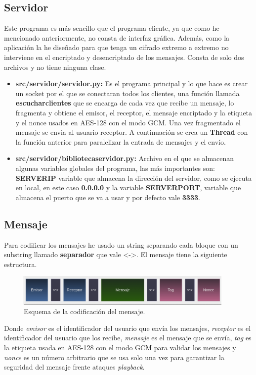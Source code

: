 \subsection{Servidor}
Este programa es más sencillo que el programa cliente, ya que como he mencionado anteriormente, no consta de interfaz gráfica. Además, como la aplicación la he diseñado para que tenga un cifrado extremo a extremo no interviene en el encriptado y desencriptado de los mensajes. Consta de solo dos archivos y no tiene ninguna clase.
\begin{itemize}
	\item \textbf{src/servidor/servidor.py:} Es el programa principal y lo que hace es crear un socket por el que se conectaran todos los clientes, una función llamada \textbf{escuchar\textunderscore clientes} que se encarga de cada vez que recibe un mensaje, lo fragmenta y obtiene el emisor, el receptor, el mensaje encriptado y la etiqueta y el nonce usados en AES-128 con el modo GCM. Una vez fragmentado el mensaje se envia al usuario receptor. A continuación se crea un \textbf{Thread} con la función anterior para paralelizar la entrada de mensajes y el envío.
	\item \textbf{src/servidor/biblioteca\textunderscore servidor.py:} Archivo en el que se almacenan algunas variables globales del programa, las más importantes son: \textbf{SERVER\textunderscore IP} variable que almacena la dirección del servidor, como se ejecuta en local, en este caso \textbf{0.0.0.0} y la variable \textbf{SERVER\textunderscore PORT}, variable que almacena el puerto que se va a usar y por defecto vale \textbf{3333}.
\end{itemize}

\subsection{Mensaje}
Para codificar los mensajes he usado un string separando cada bloque con un substring llamado \textbf{separador} que vale \textless-\textgreater. El mensaje tiene la siguiente estructura.

\begin{figure}[htb]
	\centering
	\includegraphics[width=400]{imagenes/mensaje_app.png} 
	\caption{Esquema de la codificación del mensaje.}
	\label{mensajeapp}
\end{figure}
Donde \emph{emisor} es el identificador del usuario que envía los mensajes, \emph{receptor} es el identificador del usuario que los recibe, \emph{mensaje} es el mensaje que se envía, \emph{tag} es la etiqueta usada en AES-128 con el modo GCM para validar los mensajes y \emph{nonce} es un número arbitrario que se usa solo una vez para garantizar la seguridad del mensaje frente ataques \emph{playback}. 


